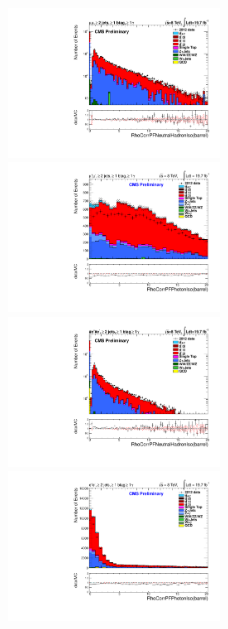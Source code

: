 \documentclass[oneside, a4paper, 11pt, ]{report}
\begin{document}
\begin{figure}
\includegraphics[width=0.5\textwidth]{Plots/ControlPlots/TTbarDiLeptonAnalysis/MuMu/Photons/AllPhotons/Log/Photon_RhoCorrectedPFNeutralHadronIso_barrel_splitTTbar_ratio.pdf}
\includegraphics[width=0.5\textwidth]{Plots/ControlPlots/TTbarDiLeptonAnalysis/MuMu/Photons/AllPhotons/Photon_RhoCorrectedPFPhotonIso_barrel_splitTTbar_ratio.pdf}\\
\includegraphics[width=0.5\textwidth]{Plots/ControlPlots/TTbarDiLeptonAnalysis/EE/Photons/AllPhotons/Log/Photon_RhoCorrectedPFNeutralHadronIso_barrel_splitTTbar_ratio.pdf}
\includegraphics[width=0.5\textwidth]{Plots/ControlPlots/TTbarDiLeptonAnalysis/EE/Photons/AllPhotons/Photon_RhoCorrectedPFPhotonIso_barrel_splitTTbar_ratio.pdf}\\

\end{figure}
\end{document}
